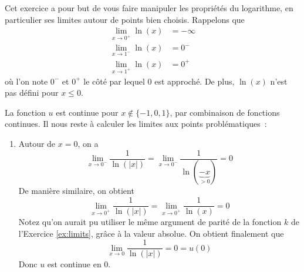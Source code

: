 \begin{exercice}[Continuité]\label{ex:weird_function}
Cet exercice a pour but de vous faire manipuler les propriétés du logarithme, en particulier ses limites autour de points bien choisis. Rappelons que
\begin{align*}
\lim_{x \to 0^+} \ln(x) & = -\infty \\
\lim_{x \to 1^-} \ln(x) & = 0^- \\
\lim_{x \to 1^+} \ln(x) & = 0^+
\end{align*}
où l'on note $0^-$ et $0^+$ le côté par lequel $0$ est approché. De plus, $\ln(x)$ n'est pas défini pour $x \leq 0$.

La fonction $u$ est continue pour $x \not\in \{-1, 0, 1\}$, par combinaison de fonctions continues. Il nous reste à calculer les limites aux points problématiques~:
\begin{enumerate}
    \item Autour de $x = 0$, on a
    \[
    \lim_{x \to 0^-} \frac{1}{\ln(|x|)} = \lim_{x \to 0^-} \frac{1}{\ln(\underbrace{-x}_{> 0})} = 0
    \]
    De manière similaire, on obtient
    \[
    \lim_{x \to 0^+} \frac{1}{\ln(|x|)} = \lim_{x \to 0^+} \frac{1}{\ln(x)} = 0
    \]
    Notez qu'on aurait pu utiliser le même argument de parité de la fonction $k$ de l'Exercice \ref{ex:limits}, grâce à la valeur absolue.
    On obtient finalement que
    \[
    \lim_{x \to 0} \frac{1}{\ln(|x|)} = 0 = u(0)
    \]
    Donc $u$ est continue en $0$.
    

\end{enumerate}
\end{exercice}
